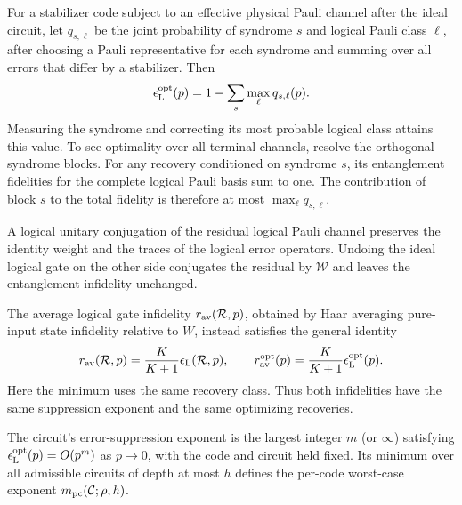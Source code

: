 \documentclass[aps,prl,reprint,notitlepage,nofootinbib,nobibnotes]{revtex4-2}
\begin{document}
For a stabilizer code subject to an effective physical Pauli channel after the ideal circuit, let
$q_{s,\ell}$ be the joint probability of syndrome $s$ and logical Pauli class $\ell$, after
choosing a Pauli representative for each syndrome and summing over all errors that differ by a
stabilizer. Then~\cite{FletcherShorWin}
\begin{equation}\label{eq:optimal-pauli-decoding}
 \epsilon_{\rm L}^{\rm opt}(p)
 =1-\sum_s\max_\ell q_{s,\ell}(p).
\end{equation}
Measuring the syndrome and correcting its most probable logical class attains this value. To see
optimality over all terminal channels, resolve the orthogonal syndrome blocks. For any recovery
conditioned on syndrome $s$, its entanglement fidelities for the complete logical Pauli basis sum
to one. The contribution of block $s$ to the total fidelity is therefore at most $\max_\ell
q_{s,\ell}$.

A logical unitary conjugation of the residual logical Pauli channel preserves the identity weight
and the traces of the logical error operators. Undoing the ideal logical gate on the other side
conjugates the residual by $\mathcal W$ and leaves the entanglement infidelity unchanged.

The average logical gate infidelity $r_{\rm av}(\mathcal R,p)$, obtained by Haar averaging
pure-input state infidelity relative to $W$, instead satisfies the general
identity~\cite{NielsenAverage}
\begin{equation}\label{eq:logical-average-infidelity}
 r_{\rm av}(\mathcal R,p)
 =\frac{K}{K+1}\epsilon_{\rm L}(\mathcal R,p),
 \qquad
 r_{\rm av}^{\rm opt}(p)
 =\frac{K}{K+1}\epsilon_{\rm L}^{\rm opt}(p).
\end{equation}
Here the minimum uses the same recovery class. Thus both infidelities have the same suppression
exponent and the same optimizing recoveries.

The circuit's error-suppression exponent is the largest integer $m$ (or $\infty$) satisfying
$\epsilon_{\rm L}^{\rm opt}(p)=O(p^m)$ as $p\to0$, with the code and circuit held fixed. Its
minimum over all admissible circuits of depth at most $h$ defines the per-code worst-case exponent
$m_{\rm pc}(\mathcal C;\rho,h)$.
\end{document}
